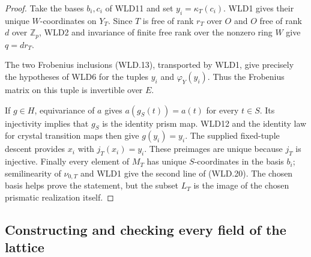 \documentclass[11pt,a4paper]{article}
\numberwithin{equation}{section}
\theoremstyle{remark}\newtheorem{remark}[theorem]{Remark}
\begin{document}
\begin{proof}
Take the bases $b_i,c_i$ of WLD11 and set
$y_i=\kappa_T(c_i)$. WLD1 gives their unique $W$-coordinates on
$Y_T$. Since $T$ is free of rank $r_T$ over $O$ and $O$ free
of rank $d$ over $\mathbb Z_p$, WLD2 and invariance of finite free
rank over the nonzero ring $W$ give $q=dr_T$.

The two Frobenius inclusions (WLD.13), transported by WLD1,
give precisely the hypotheses of WLD6 for the tuples
$y_i$ and $\varphi_Y(y_i)$. Thus the Frobenius matrix on this
tuple is invertible over $E$.

If $g\in H$, equivariance of $a$ gives $a(g_S(t))=a(t)$
for every $t\in S$. Its injectivity implies that $g_S$ is the
identity prism map. WLD12 and the identity law for crystal
transition maps then give $g(y_i)=y_i$. The supplied fixed-tuple
descent provides $x_i$ with $j_T(x_i)=y_i$. These preimages are
unique because $j_T$ is injective. Finally every element of $M_T$
has unique $S$-coordinates in the basis $b_i$; semilinearity
of $\nu_{0,T}$ and WLD1 give the second line of (WLD.20).
The chosen basis helps prove the statement, but the subset $L_T$
is the image of the chosen prismatic realization itself.
\end{proof}

\subsection{Constructing and checking every field of the lattice}
\end{document}
